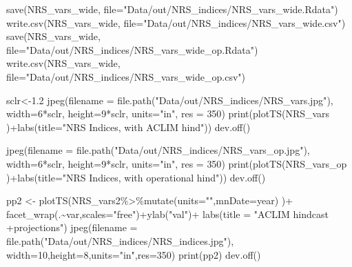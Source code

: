 \documentclass[
]{article}
\newenvironment{Shaded}{\begin{snugshade}}{\end{snugshade}}
\newcommand{\AttributeTok}[1]{\textcolor[rgb]{0.77,0.63,0.00}{#1}}
\newcommand{\DecValTok}[1]{\textcolor[rgb]{0.00,0.00,0.81}{#1}}
\newcommand{\FloatTok}[1]{\textcolor[rgb]{0.00,0.00,0.81}{#1}}
\newcommand{\FunctionTok}[1]{\textcolor[rgb]{0.00,0.00,0.00}{#1}}
\newcommand{\NormalTok}[1]{#1}
\newcommand{\OtherTok}[1]{\textcolor[rgb]{0.56,0.35,0.01}{#1}}
\newcommand{\SpecialCharTok}[1]{\textcolor[rgb]{0.00,0.00,0.00}{#1}}
\newcommand{\StringTok}[1]{\textcolor[rgb]{0.31,0.60,0.02}{#1}}
\begin{document}
\begin{Shaded}
\begin{Highlighting}[]
     \FunctionTok{save}\NormalTok{(NRS\_vars\_wide, }\AttributeTok{file=}\StringTok{"Data/out/NRS\_indices/NRS\_vars\_wide.Rdata"}\NormalTok{)}
     \FunctionTok{write.csv}\NormalTok{(NRS\_vars\_wide, }\AttributeTok{file=}\StringTok{"Data/out/NRS\_indices/NRS\_vars\_wide.csv"}\NormalTok{)}
     \FunctionTok{save}\NormalTok{(NRS\_vars\_wide, }\AttributeTok{file=}\StringTok{"Data/out/NRS\_indices/NRS\_vars\_wide\_op.Rdata"}\NormalTok{)}
     \FunctionTok{write.csv}\NormalTok{(NRS\_vars\_wide, }\AttributeTok{file=}\StringTok{"Data/out/NRS\_indices/NRS\_vars\_wide\_op.csv"}\NormalTok{)}
     
 
     
\NormalTok{      sclr}\OtherTok{\textless{}{-}}\FloatTok{1.2}
     \FunctionTok{jpeg}\NormalTok{(}\AttributeTok{filename =} \FunctionTok{file.path}\NormalTok{(}\StringTok{"Data/out/NRS\_indices/NRS\_vars.jpg"}\NormalTok{),}
          \AttributeTok{width=}\DecValTok{6}\SpecialCharTok{*}\NormalTok{sclr, }\AttributeTok{height=}\DecValTok{9}\SpecialCharTok{*}\NormalTok{sclr, }\AttributeTok{units=}\StringTok{"in"}\NormalTok{, }\AttributeTok{res =} \DecValTok{350}\NormalTok{)}
     \FunctionTok{print}\NormalTok{(}\FunctionTok{plotTS}\NormalTok{(NRS\_vars )}\SpecialCharTok{+}\FunctionTok{labs}\NormalTok{(}\AttributeTok{title=}\StringTok{"NRS Indices, with ACLIM hind"}\NormalTok{))}
     \FunctionTok{dev.off}\NormalTok{()}
     
      \FunctionTok{jpeg}\NormalTok{(}\AttributeTok{filename =} \FunctionTok{file.path}\NormalTok{(}\StringTok{"Data/out/NRS\_indices/NRS\_vars\_op.jpg"}\NormalTok{),}
          \AttributeTok{width=}\DecValTok{6}\SpecialCharTok{*}\NormalTok{sclr, }\AttributeTok{height=}\DecValTok{9}\SpecialCharTok{*}\NormalTok{sclr, }\AttributeTok{units=}\StringTok{"in"}\NormalTok{, }\AttributeTok{res =} \DecValTok{350}\NormalTok{)}
     \FunctionTok{print}\NormalTok{(}\FunctionTok{plotTS}\NormalTok{(NRS\_vars\_op )}\SpecialCharTok{+}\FunctionTok{labs}\NormalTok{(}\AttributeTok{title=}\StringTok{"NRS Indices, with operational hind"}\NormalTok{))}
     \FunctionTok{dev.off}\NormalTok{()}
     
\NormalTok{     pp2 }\OtherTok{\textless{}{-}} \FunctionTok{plotTS}\NormalTok{(NRS\_vars2}\SpecialCharTok{\%\textgreater{}\%}\FunctionTok{mutate}\NormalTok{(}\AttributeTok{units=}\StringTok{""}\NormalTok{,}\AttributeTok{mnDate=}\NormalTok{year) )}\SpecialCharTok{+}
       \FunctionTok{facet\_wrap}\NormalTok{(.}\SpecialCharTok{\textasciitilde{}}\NormalTok{var,}\AttributeTok{scales=}\StringTok{"free"}\NormalTok{)}\SpecialCharTok{+}\FunctionTok{ylab}\NormalTok{(}\StringTok{"val"}\NormalTok{)}\SpecialCharTok{+}
       \FunctionTok{labs}\NormalTok{(}\AttributeTok{title =} \StringTok{"ACLIM hindcast +projections"}\NormalTok{)}
     \FunctionTok{jpeg}\NormalTok{(}\AttributeTok{filename =} \FunctionTok{file.path}\NormalTok{(}\StringTok{"Data/out/NRS\_indices/NRS\_indices.jpg"}\NormalTok{),}
          \AttributeTok{width=}\DecValTok{10}\NormalTok{,}\AttributeTok{height=}\DecValTok{8}\NormalTok{,}\AttributeTok{units=}\StringTok{"in"}\NormalTok{,}\AttributeTok{res=}\DecValTok{350}\NormalTok{)}
     \FunctionTok{print}\NormalTok{(pp2)}
     \FunctionTok{dev.off}\NormalTok{()}
     

\end{Highlighting}
\end{Shaded}
\end{document}
